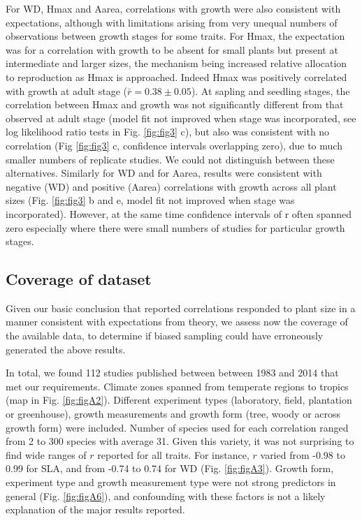 \documentclass[a4paper,11pt]{article}
\begin{document}
For WD, Hmax and Aarea, correlations with growth were also consistent with expectations, although with limitations arising from very unequal numbers of observations between growth stages for some traits. For Hmax, the expectation was for a correlation with growth to be absent for small plants but present at intermediate and larger sizes, the mechanism being increased relative allocation to reproduction as Hmax is approached. Indeed Hmax was positively correlated with growth at adult stage ($\bar{r}= 0.38 \pm 0.05$). At sapling and seedling stages, the correlation between Hmax and growth was not significantly different from that observed at adult stage (model fit not improved when stage was incorporated, see log likelihood ratio tests in Fig. \ref{fig:fig3} c), but also was consistent with no correlation (Fig \ref{fig:fig3} c, confidence intervals overlapping zero), due to much smaller numbers of replicate studies. We could not distinguish between these alternatives. Similarly for WD and for Aarea, results were consistent with negative (WD) and positive (Aarea) correlations with growth across all plant sizes (Fig. \ref{fig:fig3} b and e, model fit not improved when stage was incorporated). However, at the same time confidence intervals of r often spanned zero especially where there were small numbers of studies for particular growth stages.



\subsection*{Coverage of dataset}

Given our basic conclusion that reported correlations responded to plant size in a manner consistent with expectations from theory, we assess now the coverage of the available data, to determine if biased sampling could have erroneously generated the above results.

In total, we found 112 studies published between between 1983 and 2014 that met our requirements. Climate zones spanned from temperate regions to  tropics (map in Fig. \ref{fig:figA2}). Different experiment types (laboratory, field, plantation or greenhouse), growth measurements and growth form (tree, woody or across growth form) were included. Number of species used for each correlation ranged from 2 to 300 species with average 31. Given this variety, it was not surprising to find wide ranges of $r$ reported for all traits. For instance, $r$ varied from -0.98 to 0.99 for SLA, and from -0.74 to 0.74 for WD (Fig. \ref{fig:figA3}). Growth form, experiment type and growth measurement type were not strong predictors in general (Fig. \ref{fig:figA6}), and confounding with these factors is not a likely explanation of the major results reported.
\end{document}
